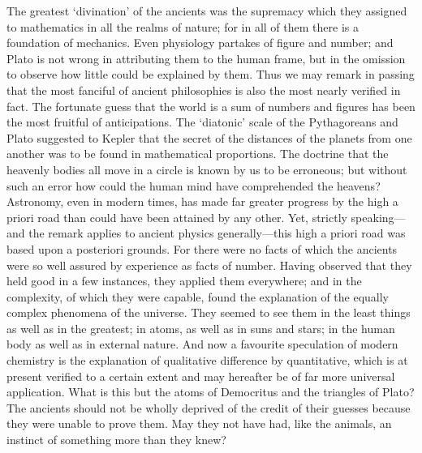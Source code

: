 The greatest ‘divination’ of the ancients was the supremacy which they
assigned to mathematics in all the realms of nature; for in all of them
there is a foundation of mechanics. Even physiology partakes of figure and
number; and Plato is not wrong in attributing them to the human frame, but
in the omission to observe how little could be explained by them. Thus we
may remark in passing that the most fanciful of ancient philosophies is
also the most nearly verified in fact. The fortunate guess that the world
is a sum of numbers and figures has been the most fruitful of
anticipations. The ‘diatonic’ scale of the Pythagoreans and Plato
suggested to Kepler that the secret of the distances of the planets from
one another was to be found in mathematical proportions. The doctrine that
the heavenly bodies all move in a circle is known by us to be erroneous;
but without such an error how could the human mind have comprehended the
heavens? Astronomy, even in modern times, has made far greater progress by
the high a priori road than could have been attained by any other. Yet,
strictly speaking—and the remark applies to ancient physics
generally—this high a priori road was based upon a posteriori
grounds. For there were no facts of which the ancients were so well
assured by experience as facts of number. Having observed that they held
good in a few instances, they applied them everywhere; and in the
complexity, of which they were capable, found the explanation of the
equally complex phenomena of the universe. They seemed to see them in the
least things as well as in the greatest; in atoms, as well as in suns and
stars; in the human body as well as in external nature. And now a
favourite speculation of modern chemistry is the explanation of
qualitative difference by quantitative, which is at present verified to a
certain extent and may hereafter be of far more universal application.
What is this but the atoms of Democritus and the triangles of Plato? The
ancients should not be wholly deprived of the credit of their guesses
because they were unable to prove them. May they not have had, like the
animals, an instinct of something more than they knew?

